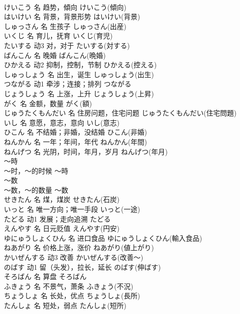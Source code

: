 \documentclass[8pt]{extreport}
\begin{document}
\begin{CJK}{UTF8}{min}
\\	けいこう	名	趋势，傾向	けいこう(傾向)	
\\	はいけい	名	背景，背景形势	はいけい(背景)	
\\	しゅっさん	名	生孩子	しゅっさん(出産)	
\\	いくじ	名	育儿，抚育	いくじ(育児)	
\\	たいする	动3	对，对于	たいする(対する)	
\\	ばんこん	名	晚婚	ばんこん(晩婚)	
\\	ひかえる	动2	抑制，控制，节制	ひかえる(控える)	
\\	しゅっしょう	名	出生，诞生	しゅっしょう(出生)	
\\	つながる	动1	牵涉；连接；排列	つながる	
\\	じょうしょう	名	上涨，上升	じょうしょう(上昇)	
\\	がく	名	金额，数量	がく(額)	
\\	じゅうたくもんだい	名	住房问题，住宅问题	じゅうたくもんだい(住宅問題)	
\\	いし	名	意愿，意志，意向	いし(意志)	
\\	ひこん	名	不结婚；非婚，没结婚	ひこん(非婚)	
\\	ねんかん	名	一年；年间，年代	ねんかん(年間)	
\\	ねんげつ	名	光阴，时间，年月，岁月	ねんげつ(年月)	
\\	～時	
\\	～时，～的时候	～時	
\\	～数	
\\	～数，～的数量	～数	
\\	せきたん	名	煤，煤炭	せきたん(石炭)	
\\	いっと	名	唯一方向；唯一手段	いっと(一途)	
\\	たどる	动1	发展；走向追溯	たどる	
\\	えんやす	名	日元贬值	えんやす(円安)	
\\	ゆにゅうしょくひん	名	进口食品	ゆにゅうしょくひん(輸入食品)	
\\	ねあがり	名	价格上涨，涨价	ねあがり(値上がり)	
\\	かいぜんする	动3	改善	かいぜんする(改善～)	
\\	のばす	动1	留（头发），拉长，延长	のばす(伸ばす)	
\\	そろばん	名	算盘	そろばん	
\\	ふきょう	名	不景气，萧条	ふきょう(不況)	
\\	ちょうしょ	名	长处，优点	ちょうしょ(長所)	
\\	たんしょ	名	短处，弱点	たんしょ(短所)	

\end{CJK}
\end{document}
